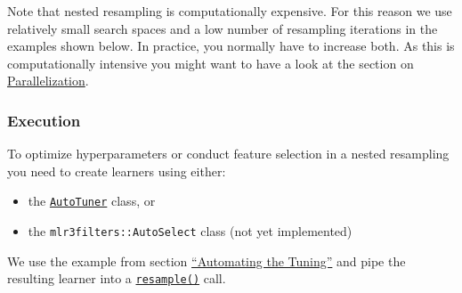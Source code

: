 \documentclass[]{article}
\newenvironment{Shaded}{\begin{snugshade}}{\end{snugshade}}
\newcommand{\DataTypeTok}[1]{\textcolor[rgb]{0.13,0.29,0.53}{#1}}
\newcommand{\DecValTok}[1]{\textcolor[rgb]{0.00,0.00,0.81}{#1}}
\newcommand{\FloatTok}[1]{\textcolor[rgb]{0.00,0.00,0.81}{#1}}
\newcommand{\KeywordTok}[1]{\textcolor[rgb]{0.13,0.29,0.53}{\textbf{#1}}}
\newcommand{\NormalTok}[1]{#1}
\newcommand{\OperatorTok}[1]{\textcolor[rgb]{0.81,0.36,0.00}{\textbf{#1}}}
\newcommand{\StringTok}[1]{\textcolor[rgb]{0.31,0.60,0.02}{#1}}
\providecommand{\tightlist}{%
  \setlength{\itemsep}{0pt}\setlength{\parskip}{0pt}}
\renewenvironment{Shaded} {\begin{snugshade}\small} {\end{snugshade}}
\begin{document}
Note that nested resampling is computationally expensive.
For this reason we use relatively small search spaces and a low number of resampling iterations in the examples shown below.
In practice, you normally have to increase both.
As this is computationally intensive you might want to have a look at the section on \protect\hyperlink{parallelization}{Parallelization}.

\hypertarget{nested-resamp-exec}{%
\subsubsection{Execution}\label{nested-resamp-exec}}

To optimize hyperparameters or conduct feature selection in a nested resampling you need to create learners using either:

\begin{itemize}
\tightlist
\item
  the \href{https://mlr3tuning.mlr-org.com/reference/AutoTuner.html}{\texttt{AutoTuner}} class, or
\item
  the \texttt{mlr3filters::AutoSelect} class (not yet implemented)
\end{itemize}

We use the example from section \protect\hyperlink{autotuner}{``Automating the Tuning''} and pipe the resulting learner into a \href{https://mlr3.mlr-org.com/reference/resample.html}{\texttt{resample()}} call.

\begin{Shaded}
\end{Shaded}
\end{document}
